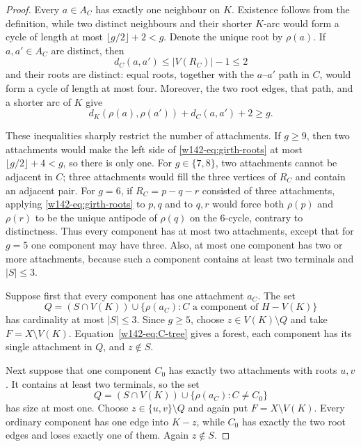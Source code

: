 \documentclass[10pt,a4paper]{amsart}
\begin{document}
\begin{proof}
Every $a\in A_C$ has exactly one neighbour on $K$.  Existence follows from
the definition, while two distinct neighbours and their shorter $K$-arc
would form a cycle of length at most $\lfloor g/2\rfloor+2<g$.  Denote the
unique root by $\rho(a)$.  If $a,a'\in A_C$ are distinct, then
\begin{equation}\label{w142-eq:attachment-distance}
 d_C(a,a')\le |V(R_C)|-1\le2
\end{equation}
and their roots are distinct: equal roots, together with the
$a$--$a'$ path in $C$, would form a cycle of length at most four.  Moreover,
the two root edges, that path, and a shorter arc of $K$ give
\begin{equation}\label{w142-eq:girth-roots}
 d_K(\rho(a),\rho(a'))+d_C(a,a')+2\ge g.
\end{equation}

These inequalities sharply restrict the number of attachments.  If
$g\ge9$, then two attachments would make the left side of
\eqref{w142-eq:girth-roots} at most $\lfloor g/2\rfloor+4<g$, so there is only
one.  For $g\in\{7,8\}$, two attachments cannot be adjacent in $C$; three
attachments would fill the three vertices of $R_C$ and contain an adjacent
pair.  For $g=6$, if $R_C=p-q-r$ consisted of three attachments, applying
\eqref{w142-eq:girth-roots} to $p,q$ and to $q,r$ would force both $\rho(p)$ and
$\rho(r)$ to be the unique antipode of $\rho(q)$ on the $6$-cycle,
contrary to distinctness.  Thus every component has at most two
attachments, except that for $g=5$ one component may have three.  Also, at
most one component has two or more attachments, because such a component
contains at least two terminals and $|S|\le3$.

Suppose first that every component has one attachment $a_C$.  The set
\[
 Q=(S\cap V(K))\cup\{\rho(a_C):C\text{ a component of }H-V(K)\}
\]
has cardinality at most $|S|\le3$.  Since $g\ge5$, choose $z\in V(K)\setminus
Q$ and take $F=X\setminus V(K)$.  Equation~\eqref{w142-eq:C-tree} gives a forest,
each component has its single attachment in $Q$, and $z\notin S$.

Next suppose that one component $C_0$ has exactly two attachments with roots
$u,v$.  It contains at least two terminals, so the set
\[
 Q=(S\cap V(K))\cup
   \{\rho(a_C):C\ne C_0\}
\]
has size at most one.  Choose $z\in\{u,v\}\setminus Q$ and again put
$F=X\setminus V(K)$.  Every ordinary component has one edge into $K-z$,
while $C_0$ has exactly the two root edges and loses exactly one of them.
Again $z\notin S$.


\end{proof}
\end{document}
